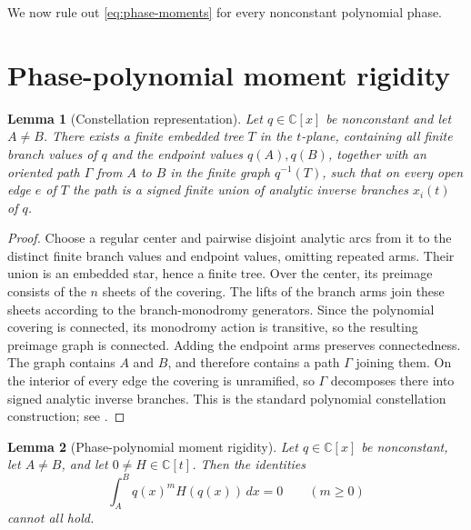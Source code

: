 \documentclass[11pt]{article}
\numberwithin{equation}{section}
\newtheorem{lemma}[lemma]{Lemma}
\theoremstyle{definition}
\theoremstyle{remark}
\newcommand{\C}{\mathbb C}
\begin{document}
We now rule out \eqref{eq:phase-moments} for every nonconstant polynomial phase.

\section{Phase-polynomial moment rigidity}\label{sec:exp-phase-rigidity}

\begin{lemma}[Constellation representation]\label{lem:constellation}
Let $q\in\C[x]$ be nonconstant and let $A\ne B$.  There exists a finite embedded tree $T$ in the $t$-plane, containing all finite branch values of $q$ and the endpoint values $q(A),q(B)$, together with an oriented path $\Gamma$ from $A$ to $B$ in the finite graph $q^{-1}(T)$, such that on every open edge $e$ of $T$ the path is a signed finite union of analytic inverse branches $x_i(t)$ of $q$.
\end{lemma}

\begin{proof}
Choose a regular center and pairwise disjoint analytic arcs from it to the distinct finite branch values and endpoint values, omitting repeated arms.  Their union is an embedded star, hence a finite tree.  Over the center, its preimage consists of the $n$ sheets of the covering.  The lifts of the branch arms join these sheets according to the branch-monodromy generators.  Since the polynomial covering is connected, its monodromy action is transitive, so the resulting preimage graph is connected.  Adding the endpoint arms preserves connectedness.  The graph contains $A$ and $B$, and therefore contains a path $\Gamma$ joining them.  On the interior of every edge the covering is unramified, so $\Gamma$ decomposes there into signed analytic inverse branches.  This is the standard polynomial constellation construction; see \cite[\S2.1]{PakovichMuzychuk}.
\end{proof}

\begin{lemma}[Phase-polynomial moment rigidity]\label{lem:phase-moment}
Let $q\in\C[x]$ be nonconstant, let $A\ne B$, and let $0\ne H\in\C[t]$.  Then the identities
\[
  \int_A^B q(x)^mH(q(x))\,dx=0
  \qquad(m\ge0)
\]
cannot all hold.
\end{lemma}
\end{document}
